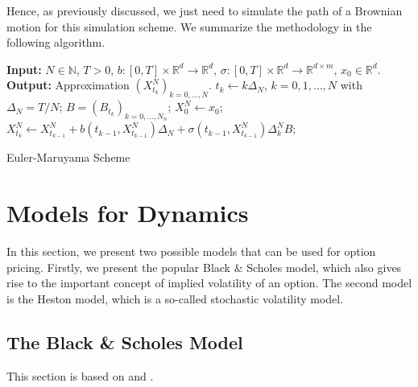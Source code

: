 Hence, as previously discussed, we just need to simulate the path of a Brownian motion for this simulation scheme. We summarize the methodology in the following algorithm.
\begin{algorithm}[H] 
\SetAlgoLined
    \textbf{Input:} $N\in\mathbb{N}$, $T>0$, $b:[0,T]\times \mathbb{R}^{d}\to\mathbb{R}^{d}$, $\sigma:[0,T]\times\mathbb{R}^{d}\to\mathbb{R}^{d\times m}$, $x_{0}\in\mathbb{R}^{d}$.\newline
    \textbf{Output:} Approximation $(X_{t_k}^{N})_{k=0,\dots,N}.$\newline
    $t_{k}\gets k\Delta_{N}$, $k=0,1,\dots,N$ with $\Delta_{N}=T/N$; \newline
    $B=(B_{t_k})_{k=0,\dots,N_{n}}$;\newline
    $X_0^{N}\gets x_0$;\newline
        {$X_{t_k}^{N}\gets X_{t_{k-1}}^{N} + b(t_{k-1},X_{t_{k-1}}^{N})\Delta_{N} + \sigma(t_{k-1},X_{t_{k-1}}^{N})\Delta_{k}^{N}B$;}
\caption{Euler-Maruyama Scheme}
\label{alg:euler}
\end{algorithm}

\section{Models for Dynamics}
In this section, we present two possible models that can be used for option pricing. Firstly, we present the popular Black \& Scholes model, which also gives rise to the important concept of implied volatility of an option. The second model is the Heston model, which is a so-called stochastic volatility model. 
\subsection{The Black \& Scholes Model}\label{sec:BSM}
This section is based on \cite{black1973} and \cite{blackscholes}.

